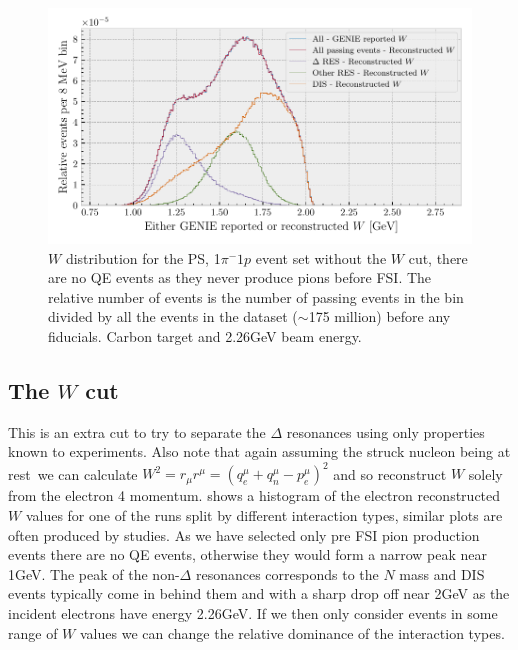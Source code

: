 \documentclass[a4paper,12pt]{article}
\begin{document}
\begin{figure}[H]
    \centering
    \includegraphics{figures/python/W_demo.pdf}
    \caption{
        $W$ distribution for the PS, 1$\pi^-1p$ event set without the $W$ cut, there are no QE events as they never produce pions before FSI.
        The relative number of events is the number of passing events in the bin divided by all the events in the dataset ($\sim$175 million) before any fiducials.
        Carbon target and 2.26\si{GeV} beam energy.
    }\label{fig:W_demo}
\end{figure}

\subsection{The $W$ cut}
This is an extra cut to try to separate the $\Delta$ resonances using only properties known to experiments.
Also note that again assuming the struck nucleon being at rest\footnotemark\ we can calculate $W^2 = r_\mu r^\mu = (q_e^\mu + q_n^\mu - p_e^\mu)^2$ and so reconstruct $W$ solely from the electron 4 momentum.
 shows a histogram of the electron reconstructed $W$ values for one of the runs split by different interaction types, similar plots are often produced by studies.
As we have selected only pre FSI pion production events there are no QE events, otherwise they would form a narrow peak near 1\si{GeV}.
The peak of the non-$\Delta$ resonances corresponds to the $N$ mass and DIS events typically come in behind them and with a sharp drop off near 2\si{GeV} as the incident electrons have energy 2.26\si{GeV}.
If we then only consider events in some range of $W$ values we can change the relative dominance of the interaction types.
\end{document}
